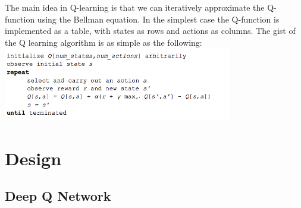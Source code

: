 \documentclass[twoside,letterpaper]{article}
\begin{document}
{The main idea in Q-learning is that we can iteratively approximate the Q-function using the Bellman equation. In the simplest case the Q-function is implemented as a table, with states as rows and actions as columns. The gist of the Q learning algorithm is as simple as the following:
\centering
\includegraphics[width=10cm]{images/q4.png}\\

}
\bigskip
\clearpage\section[Design]{\rmfamily\bfseries\color{black}
Design}
\subsection[Deep Q Network]{\rmfamily\bfseries\color{black}
Deep Q Network}
\end{document}
